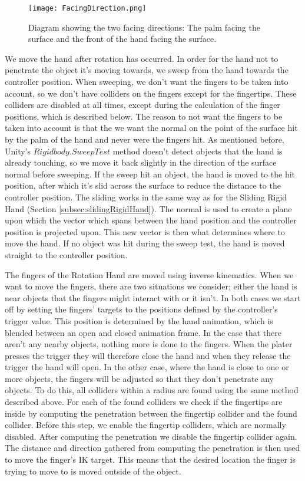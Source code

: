 \begin{figure}[H]
\centering
\texttt{[image: FacingDirection.png]}
\caption{Diagram showing the two facing directions: The palm facing the surface and the front of the hand facing the surface.}
\label{fig:rotationHandFacingDirections}
\end{figure}

We move the hand after rotation has occurred. In order for the hand not to penetrate the object it's moving towards, we sweep from the hand towards the controller position. When sweeping, we don't want the fingers to be taken into account, so we don't have colliders on the fingers except for the fingertips. These colliders are disabled at all times, except during the calculation of the finger positions, which is described below. The reason to not want the fingers to be taken into account is that the we want the normal on the point of the surface hit by the palm of the hand and never were the fingers hit. As mentioned before, Unity's $Rigidbody.SweepTest$ method doesn't detect objects that the hand is already touching, so we move it back slightly in the direction of the surface normal before sweeping. If the sweep hit an object, the hand is moved to the hit position, after which it's slid across the surface to reduce the distance to the controller position. The sliding works in the same way as for the Sliding Rigid Hand (Section \ref{subsec:slidingRigidHand}). The normal is used to create a plane upon which the vector which spans between the hand position and the controller position is projected upon. This new vector is then what determines where to move the hand. If no object was hit during the sweep test, the hand is moved straight to the controller position.

The fingers of the Rotation Hand are moved using inverse kinematics. When we want to move the fingers, there are two situations we consider; either the hand is near objects that the fingers might interact with or it isn't. In both cases we start off by setting the fingers' targets to the positions defined by the controller's trigger value. This position is determined by the hand animation, which is blended between an open and closed animation frame. In the case that there aren't any nearby objects, nothing more is done to the fingers. When the plater presses the trigger they will therefore close the hand and when they release the trigger the hand will open. In the other case, where the hand is close to one or more objects, the fingers will be adjusted so that they don't penetrate any objects. To do this, all colliders within a radius are found using the same method described above. For each of the found colliders we check if the fingertips are inside by computing the penetration between the fingertip collider and the found collider. Before this step, we enable the fingertip colliders, which are normally disabled. After computing the penetration we disable the fingertip collider again. The distance and direction gathered from computing the penetration is then used to move the finger's IK target. This means that the desired location the finger is trying to move to is moved outside of the object.

